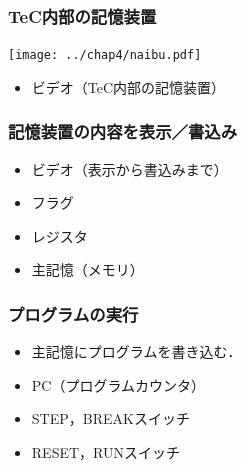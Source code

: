 \documentclass[handout]{beamer}         %
\begin{document}
\begin{frame}
  \frametitle{TeC内部の記憶装置}
  \vfill
  \centerline{\texttt{[image: ../chap4/naibu.pdf]}}
  \vfill
  \begin{itemize}
    \item ビデオ（TeC内部の記憶装置）
  \end{itemize}
  \vfill
\end{frame}

\begin{frame}
  \frametitle{記憶装置の内容を表示／書込み}
  \begin{itemize}
    \item ビデオ（表示から書込みまで）
    \item フラグ
    \item レジスタ
    \item 主記憶（メモリ）
  \end{itemize}
  \vfill
  \vfill
  \vfill
\end{frame}

\begin{frame}
  \frametitle{プログラムの実行}
  \begin{itemize}
    \item 主記憶にプログラムを書き込む．
    \item PC（プログラムカウンタ）
    \item STEP，BREAKスイッチ
    \item RESET，RUNスイッチ
  \end{itemize}
  \vfill
  \vfill
  \vfill
\end{frame}
\end{document}
